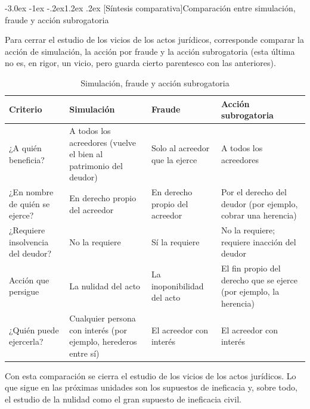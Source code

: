 \documentclass[12pt,oneside]{book}
\makeatletter
\renewcommand\section{\@startsection{section}{1}{\z@}%
  {-3.0ex \@plus -1ex \@minus -.2ex}{1.2ex \@plus .2ex}%
  {\normalfont\large\bfseries\color{acento}}}
\makeatother
\begin{document}

\section[Síntesis comparativa]{Comparación entre simulación, fraude y acción subrogatoria}

Para cerrar el estudio de los vicios de los actos jurídicos, corresponde comparar la acción de simulación, la acción por fraude y la acción subrogatoria (esta última no es, en rigor, un vicio, pero guarda cierto parentesco con las anteriores).

\begin{table}[H]
\centering
\caption{Simulación, fraude y acción subrogatoria}
\begin{tabularx}{\textwidth}{
    >{\raggedright\arraybackslash}p{}
    >{\raggedright\arraybackslash}X
    >{\raggedright\arraybackslash}X
    >{\raggedright\arraybackslash}X
}
\toprule
\textbf{Criterio} & \textbf{Simulación} & \textbf{Fraude} & \textbf{Acción subrogatoria} \\
\midrule
¿A quién beneficia? & A todos los acreedores (vuelve el bien al patrimonio del deudor) & Solo al acreedor que la ejerce & A todos los acreedores \\
\addlinespace
¿En nombre de quién se ejerce? & En derecho propio del acreedor & En derecho propio del acreedor & Por el derecho del deudor (por ejemplo, cobrar una herencia) \\
\addlinespace
¿Requiere insolvencia del deudor? & No la requiere & Sí la requiere & No la requiere; requiere inacción del deudor \\
\addlinespace
Acción que persigue & La nulidad del acto & La inoponibilidad del acto & El fin propio del derecho que se ejerce (por ejemplo, la herencia) \\
\addlinespace
¿Quién puede ejercerla? & Cualquier persona con interés (por ejemplo, herederos entre sí) & El acreedor con interés & El acreedor con interés \\
\bottomrule
\end{tabularx}
\end{table}

Con esta comparación se cierra el estudio de los vicios de los actos jurídicos. Lo que sigue en las próximas unidades son los supuestos de ineficacia y, sobre todo, el estudio de la nulidad como el gran supuesto de ineficacia civil.
\end{document}
